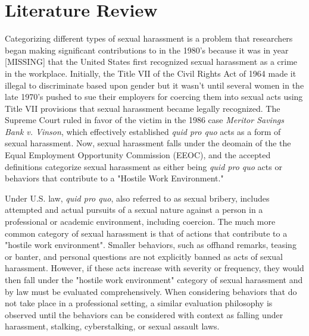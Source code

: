\section{Literature Review}
\label{sec-literature}

Categorizing different types of sexual harassment is a problem that researchers began making significant contributions to in the 1980's because it was in year [MISSING] that the United States first recognized sexual harassment as a crime in the workplace. Initially, the Title VII of the Civil Rights Act of 1964 made it illegal to discriminate based upon gender but it wasn't until several women in the late 1970's pushed to sue their employers for coercing them into sexual acts using Title VII provisions that sexual harassment became legally recognized. The Supreme Court ruled in favor of the victim in the 1986 case \textit{Meritor Savings Bank v. Vinson}, which effectively established \textit{quid pro quo} acts as a form of sexual harassment. Now, sexual harassment falls under the deomain of the the Equal Employment Opportunity Commission (EEOC), and the accepted definitions categorize sexual harassment as either being \textit{quid pro quo} acts or behaviors that contribute to a "Hostile Work Environment."

Under U.S. law, \textit{quid pro quo}, also referred to as sexual bribery, includes attempted and actual pursuits of a sexual nature against a person in a professional or academic environment, including coercion. The much more common category of sexual harassment is that of actions that contribute to a "hostile work environment". Smaller behaviors, such as offhand remarks, teasing or banter, and personal questions are not explicitly banned as acts of sexual harassment. However, if these acts increase with severity or frequency, they would then fall under the "hostile work environment" category of sexual harassment and by law must be evaluated comprehensively. When considering behaviors that do not take place in a professional setting, a similar evaluation philosophy is observed until the behaviors can be considered with context as falling under harassment, stalking, cyberstalking, or sexual assault laws.

